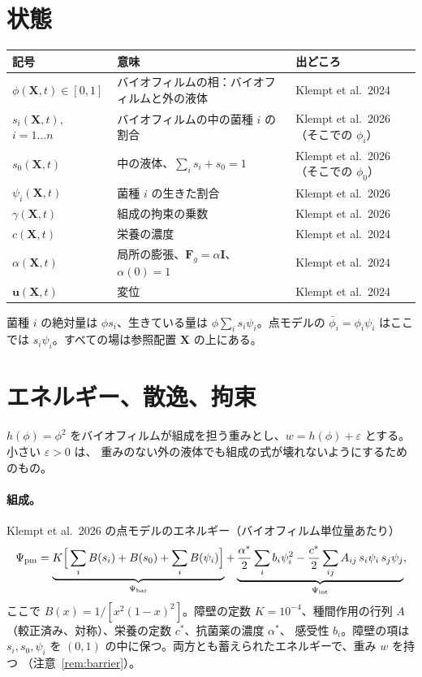 \documentclass[11pt,a4paper]{article}
\theoremstyle{definition}
\newcommand{\living}{\textstyle\sum_i s_i\psi_i}
\begin{document}
\section{状態}

\begin{center}\small
\begin{tabularx}{\linewidth}{@{}lYl@{}}
\toprule
記号 & 意味 & 出どころ\\
\midrule
$\phi(\mathbf X,t)\in[0,1]$ & バイオフィルムの相：バイオフィルムと外の液体 & Klempt et al.\ 2024\\
$s_i(\mathbf X,t)$, $i=1\dots n$ & バイオフィルムの中の菌種 $i$ の割合 & Klempt et al.\ 2026（そこでの $\phi_i$）\\
$s_0(\mathbf X,t)$ & 中の液体、$\sum_is_i+s_0=1$ & Klempt et al.\ 2026（そこでの $\phi_0$）\\
$\psi_i(\mathbf X,t)$ & 菌種 $i$ の生きた割合 & Klempt et al.\ 2026\\
$\gamma(\mathbf X,t)$ & 組成の拘束の乗数 & Klempt et al.\ 2026\\
$c(\mathbf X,t)$ & 栄養の濃度 & Klempt et al.\ 2024\\
$\alpha(\mathbf X,t)$ & 局所の膨張、$\mathbf F_g=\alpha\mathbf I$、$\alpha(0)=1$ & Klempt et al.\ 2024\\
$\mathbf u(\mathbf X,t)$ & 変位 & Klempt et al.\ 2024\\
\bottomrule
\end{tabularx}
\end{center}
菌種 $i$ の絶対量は $\phi s_i$、生きている量は $\phi\living$。点モデルの $\bar\phi_i=\phi_i\psi_i$ はここでは
$s_i\psi_i$。すべての場は参照配置 $\mathbf X$ の上にある。

\section{エネルギー、散逸、拘束}

$h(\phi)=\phi^2$ をバイオフィルムが組成を担う重みとし、$w=h(\phi)+\varepsilon$ とする。小さい $\varepsilon>0$ は、
重みのない外の液体でも組成の式が壊れないようにするためのもの。

\paragraph{組成。} Klempt et al.\ 2026 の点モデルのエネルギー（バイオフィルム単位量あたり）
\begin{equation}
\Psi_{\rm pm}=\underbrace{K\Big[\sum_iB(s_i)+B(s_0)+\sum_iB(\psi_i)\Big]}_{\Psi_{\rm bar}}
+\underbrace{\frac{\alpha^*}{2}\sum_ib_i\psi_i^2-\frac{c^*}{2}\sum_{ij}A_{ij}\,s_i\psi_i\,s_j\psi_j}_{\Psi_{\rm int}},
\label{eq:pm}
\end{equation}
ここで $B(x)=1/[x^2(1-x)^2]$。障壁の定数 $K=10^{-4}$、種間作用の行列 $A$（較正済み、対称）、栄養の定数 $c^*$、抗菌薬の濃度 $\alpha^*$、
感受性 $b_i$。障壁の項は $s_i,s_0,\psi_i$ を $(0,1)$ の中に保つ。両方とも蓄えられたエネルギーで、重み $w$ を持つ
（注意~\ref{rem:barrier}）。
\end{document}
